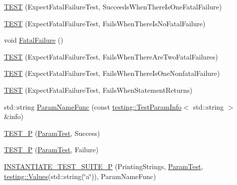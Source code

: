 \begin{DoxyCompactItemize}
\item 
\mbox{\hyperlink{googletest-master_2googletest_2test_2googletest-output-test___8cc_a0d894cc9ae86412b4c156748602a23a7}{T\+E\+ST}} (Expect\+Fatal\+Failure\+Test, Succeeds\+When\+There\+Is\+One\+Fatal\+Failure)
\item 
\mbox{\hyperlink{googletest-master_2googletest_2test_2googletest-output-test___8cc_af8e8545243605b2ba121e253ec48785e}{T\+E\+ST}} (Expect\+Fatal\+Failure\+Test, Fails\+When\+There\+Is\+No\+Fatal\+Failure)
\item 
void \mbox{\hyperlink{googletest-master_2googletest_2test_2googletest-output-test___8cc_acdca9b16622e8a506a39240c8809af38}{Fatal\+Failure}} ()
\item 
\mbox{\hyperlink{googletest-master_2googletest_2test_2googletest-output-test___8cc_a4fd11a245bf0e8eb46d78c8dc14c730e}{T\+E\+ST}} (Expect\+Fatal\+Failure\+Test, Fails\+When\+There\+Are\+Two\+Fatal\+Failures)
\item 
\mbox{\hyperlink{googletest-master_2googletest_2test_2googletest-output-test___8cc_a35fafc42558ee14c42320b359c270026}{T\+E\+ST}} (Expect\+Fatal\+Failure\+Test, Fails\+When\+There\+Is\+One\+Nonfatal\+Failure)
\item 
\mbox{\hyperlink{googletest-master_2googletest_2test_2googletest-output-test___8cc_aca5344af5eed2eefc512c555acbe5511}{T\+E\+ST}} (Expect\+Fatal\+Failure\+Test, Fails\+When\+Statement\+Returns)
\item 
std\+::string \mbox{\hyperlink{googletest-master_2googletest_2test_2googletest-output-test___8cc_a61c686cb1c0f8f19c100ff975482ec7a}{Param\+Name\+Func}} (const \mbox{\hyperlink{structtesting_1_1_test_param_info}{testing\+::\+Test\+Param\+Info}}$<$ std\+::string $>$ \&info)
\item 
\mbox{\hyperlink{googletest-master_2googletest_2test_2googletest-output-test___8cc_a4e7fc7682f9a8a168b78d53b05fab8bf}{T\+E\+S\+T\+\_\+P}} (\mbox{\hyperlink{class_param_test}{Param\+Test}}, Success)
\item 
\mbox{\hyperlink{googletest-master_2googletest_2test_2googletest-output-test___8cc_a0847a99be23b980115e2dd88a1bd60cc}{T\+E\+S\+T\+\_\+P}} (\mbox{\hyperlink{class_param_test}{Param\+Test}}, Failure)
\item 
\mbox{\hyperlink{googletest-master_2googletest_2test_2googletest-output-test___8cc_a5c488fe4474fec68c24acfc4fb353ed7}{I\+N\+S\+T\+A\+N\+T\+I\+A\+T\+E\+\_\+\+T\+E\+S\+T\+\_\+\+S\+U\+I\+T\+E\+\_\+P}} (Printing\+Strings, \mbox{\hyperlink{class_param_test}{Param\+Test}}, \mbox{\hyperlink{namespacetesting_abd3c87b40c2a0663691c9b617ed5fcc2}{testing\+::\+Values}}(std\+::string(\char`\"{}a\char`\"{})), Param\+Name\+Func)

\end{DoxyCompactItemize}
